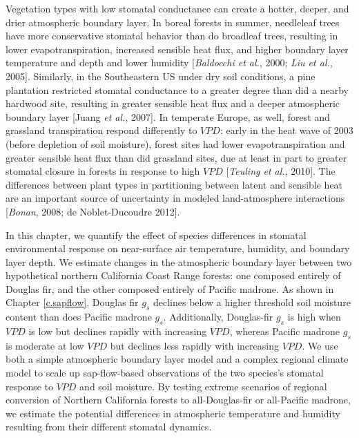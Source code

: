 Vegetation types with low stomatal conductance can create a hotter, deeper, and drier atmospheric boundary layer.  In boreal forests in summer, needleleaf trees have more conservative stomatal behavior than do broadleaf trees, resulting in lower evapotranspiration, increased sensible heat flux, and higher boundary layer temperature and depth and lower humidity [\textit{Baldocchi et al.}, 2000; \textit{Liu et al.}, 2005].  Similarly, in the Southeastern US under dry soil conditions, a pine plantation restricted stomatal conductance to a greater degree than did a nearby hardwood site, resulting in greater sensible heat flux and a deeper atmospheric boundary layer [Juang \textit{et al.}, 2007].  In temperate Europe, as well, forest and grassland transpiration respond differently to $VPD$: early in the heat wave of 2003 (before depletion of soil moisture), forest sites had lower evapotranspiration and greater sensible heat flux than did grassland sites, due at least in part to greater stomatal closure in forests in response to high $VPD$ [\textit{Teuling et al.}, 2010].  The differences between plant types in partitioning between latent and sensible heat are an important source of uncertainty in modeled land-atmosphere interactions [\textit{Bonan}, 2008; de Noblet-Ducoudre 2012].

In this chapter, we quantify the effect of species differences in stomatal environmental response on near-surface air temperature, humidity, and boundary layer depth.  We estimate changes in the atmospheric boundary layer between two hypothetical northern California Coast Range forests: one composed entirely of Douglas fir, and the other composed entirely of Pacific madrone.  As shown in Chapter \ref{c.sapflow}, Douglas fir $g_s$ declines below a higher threshold soil moisture content than does Pacific madrone $g_s$.  Additionally, Douglas-fir $g_s$ is high when $VPD$ is low but declines rapidly with increasing $VPD$, whereas Pacific madrone $g_s$ is moderate at low $VPD$ but declines less rapidly with increasing $VPD$.  We use both a simple atmospheric boundary layer model and a complex regional climate model to scale up sap-flow-based observations of the two species's stomatal response to $VPD$ and soil moisture.  By testing extreme scenarios of regional conversion of Northern California forests to all-Douglas-fir or all-Pacific madrone, we estimate the potential differences in atmospheric temperature and humidity resulting from their different stomatal dynamics.
